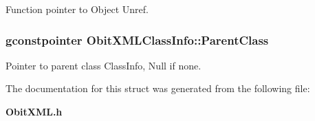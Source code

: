 Function pointer to Object Unref. 

\subsubsection{\setlength{\rightskip}{0pt plus 5cm}gconstpointer {\bf Obit\-XMLClass\-Info::Parent\-Class}}\label{structObitXMLClassInfo_o3}


Pointer to parent class Class\-Info, Null if none. 



The documentation for this struct was generated from the following file:\begin{CompactItemize}
\item 
{\bf Obit\-XML.h}\end{CompactItemize}
